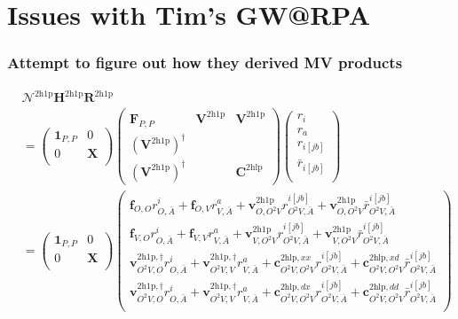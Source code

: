 
\section{Issues with Tim's GW@RPA}
\begin{frame}
    \frametitle{Attempt to figure out how they derived MV products}


\begin{align}
&\bm{\mathcal{N}}^{2\mathrm{h1p}} \bm{H}^{2\mathrm{h1p}} \bm{R}^{2\mathrm{h1p}} \\
&= \begin{pmatrix}
\bm{1}_{P,P} & 0 \\
0 & \bm{X} \\
\end{pmatrix}
\begin{pmatrix}
\bm{F}_{P,P} & \bm{V}^{2\mathrm{h1p}} & \bm{V}^{2\mathrm{h1p}} \\
\left(\bm{V}^{2\mathrm{h1p}}\right)^{\dagger} &  &  \\
\left(\bm{V}^{2\mathrm{h1p}}\right)^{\dagger} &  & \bm{C}^{2\mathrm{hlp}}
\end{pmatrix}
\begin{pmatrix}
r_i \\
r_a \\
r_{i[j b]} \\
\bar{r}_{i[j b]} \\
\end{pmatrix}\\
&= \begin{pmatrix}
\bm{1}_{P,P} & 0 \\
0 & \bm{X} \\
\end{pmatrix}
\begin{pmatrix}
\bm{f}_{O,O}r^i_{O,\bar{A}} + \bm{f}_{O,V}r^a_{V,\bar{A}} + \bm{v}^{2\mathrm{h1p}}_{O,O^2V} r^{i[j b]}_{O^2V, \bar{A}} + \bm{v}^{2\mathrm{h1p}}_{O,O^2V} \bar{r}^{i[j b]}_{O^2V, \bar{A}} \\
\bm{f}_{V,O}r^i_{O,\bar{A}} + \bm{f}_{V,V}r^a_{V,\bar{A}} + \bm{v}^{2\mathrm{h1p}}_{V,O^2V} r^{i[j b]}_{O^2V, \bar{A}} + \bm{v}^{2\mathrm{h1p}}_{V,O^2V} \bar{r}^{i[j b]}_{O^2V, \bar{A}} \\
\bm{v}^{2\mathrm{h1p},\dagger}_{O^2V,O} r^i_{O,\bar{A}} + \bm{v}^{2\mathrm{h1p},\dagger}_{O^2V,V} r^a_{V,\bar{A}} + \bm{c}^{2\mathrm{hlp},xx}_{O^2V,O^2V} r^{i[j b]}_{O^2V, \bar{A}} + \bm{c}^{2\mathrm{hlp},xd}_{O^2V,O^2V} \bar{r}^{i[j b]}_{O^2V, \bar{A}} \\
\bm{v}^{2\mathrm{h1p},\dagger}_{O^2V,O} r^i_{O,\bar{A}} + \bm{v}^{2\mathrm{h1p},\dagger}_{O^2V,V} r^a_{V,\bar{A}} + \bm{c}^{2\mathrm{hlp},dx}_{O^2V,O^2V} r^{i[j b]}_{O^2V, \bar{A}} + \bm{c}^{2\mathrm{hlp},dd}_{O^2V,O^2V} \bar{r}^{i[j b]}_{O^2V, \bar{A}} \\

\end{pmatrix}
\end{align}
\end{frame}
